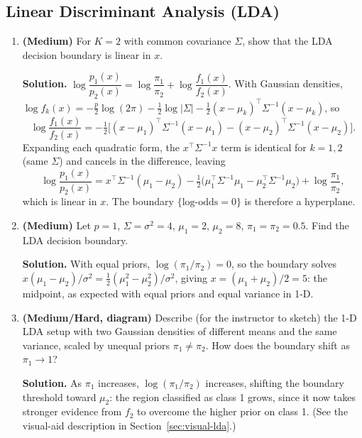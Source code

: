\documentclass[11pt]{article}
\begin{document}
\subsection{Linear Discriminant Analysis (LDA)}
\begin{enumerate}
\item \textbf{(Medium)} For $K=2$ with common covariance $\Sigma$, show that the LDA decision boundary is linear in $x$.

\textbf{Solution.} $\log\dfrac{p_1(x)}{p_2(x)} = \log\dfrac{\pi_1}{\pi_2} + \log\dfrac{f_1(x)}{f_2(x)}$. With Gaussian densities, $\log f_k(x) = -\tfrac{p}{2}\log(2\pi)-\tfrac12\log|\Sigma|-\tfrac12(x-\mu_k)^\top\Sigma^{-1}(x-\mu_k)$, so
\[
\log\frac{f_1(x)}{f_2(x)} = -\tfrac12\Big[(x-\mu_1)^\top\Sigma^{-1}(x-\mu_1) - (x-\mu_2)^\top\Sigma^{-1}(x-\mu_2)\Big].
\]
Expanding each quadratic form, the $x^\top\Sigma^{-1}x$ term is identical for $k=1,2$ (same $\Sigma$) and cancels in the difference, leaving
\[
\log\frac{p_1(x)}{p_2(x)} = x^\top\Sigma^{-1}(\mu_1-\mu_2) - \tfrac12\big(\mu_1^\top\Sigma^{-1}\mu_1-\mu_2^\top\Sigma^{-1}\mu_2\big) + \log\frac{\pi_1}{\pi_2},
\]
which is linear in $x$. The boundary $\{\text{log-odds}=0\}$ is therefore a hyperplane.

\item \textbf{(Medium)} Let $p=1$, $\Sigma=\sigma^2=4$, $\mu_1=2$, $\mu_2=8$, $\pi_1=\pi_2=0.5$. Find the LDA decision boundary.

\textbf{Solution.} With equal priors, $\log(\pi_1/\pi_2)=0$, so the boundary solves $x(\mu_1-\mu_2)/\sigma^2 = \tfrac12(\mu_1^2-\mu_2^2)/\sigma^2$, giving $x = (\mu_1+\mu_2)/2 = 5$: the midpoint, as expected with equal priors and equal variance in 1-D.

\item \textbf{(Medium/Hard, diagram)} Describe (for the instructor to sketch) the 1-D LDA setup with two Gaussian densities of different means and the same variance, scaled by unequal priors $\pi_1\ne\pi_2$. How does the boundary shift as $\pi_1\to 1$?

\textbf{Solution.} As $\pi_1$ increases, $\log(\pi_1/\pi_2)$ increases, shifting the boundary threshold toward $\mu_2$: the region classified as class 1 grows, since it now takes stronger evidence from $f_2$ to overcome the higher prior on class 1. (See the visual-aid description in Section~\ref{sec:visual-lda}.)
\end{enumerate}
\end{document}
